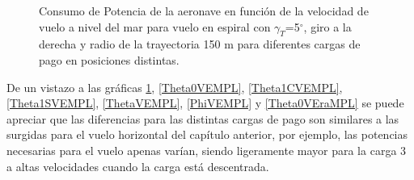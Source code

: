 \begin{figure}
	\centering
	\caption{Consumo de Potencia de la aeronave en función de la velocidad de vuelo a nivel del mar para vuelo en espiral con $\gamma_T$=5$^\circ$, giro a la derecha y radio de la trayectoria 150 m para diferentes cargas de pago en posiciones distintas.}
	\label{PMVEMPL}
\end{figure}

De un vistazo a las gráficas \ref{PMVEMPL}, \ref{Theta0VEMPL}, \ref{Theta1CVEMPL}, \ref{Theta1SVEMPL}, \ref{ThetaVEMPL}, \ref{PhiVEMPL} y \ref{Theta0VEraMPL} se puede apreciar que las diferencias para las distintas cargas de pago son similares a las surgidas para el vuelo horizontal del capítulo anterior, por ejemplo, las potencias necesarias para el vuelo apenas varían, siendo ligeramente mayor para la carga 3 a altas velocidades cuando la carga está descentrada.

